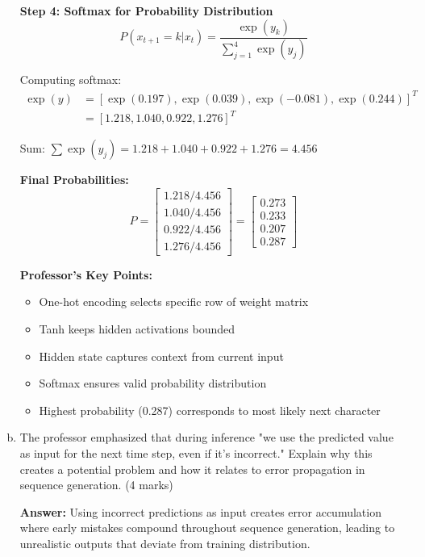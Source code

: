 \documentclass[12pt]{article}
\newcommand{\answer}[1]{{\color{answercolor}\textbf{Answer:} #1}}
\begin{document}
\begin{enumerate}[(a)]
{    \textbf{Step 4: Softmax for Probability Distribution}
    $$P(x_{t+1} = k | x_t) = \frac{\exp(y_k)}{\sum_{j=1}^4 \exp(y_j)}$$
    
    Computing softmax:
    \begin{align}
    \exp(y) &= [\exp(0.197), \exp(0.039), \exp(-0.081), \exp(0.244)]^T \\
    &= [1.218, 1.040, 0.922, 1.276]^T
    \end{align}
    
    Sum: $\sum \exp(y_j) = 1.218 + 1.040 + 0.922 + 1.276 = 4.456$
    
    \textbf{Final Probabilities:}
    $$P = \begin{bmatrix} 1.218/4.456 \\ 1.040/4.456 \\ 0.922/4.456 \\ 1.276/4.456 \end{bmatrix} = \begin{bmatrix} 0.273 \\ 0.233 \\ 0.207 \\ 0.287 \end{bmatrix}$$
    
    \textbf{Professor's Key Points:}
    \begin{itemize}
        \item One-hot encoding selects specific row of weight matrix
        \item Tanh keeps hidden activations bounded
        \item Hidden state captures context from current input
        \item Softmax ensures valid probability distribution
        \item Highest probability (0.287) corresponds to most likely next character
    \end{itemize}
    }
    
    \item The professor emphasized that during inference "we use the predicted value as input for the next time step, even if it's incorrect." Explain why this creates a potential problem and how it relates to error propagation in sequence generation. \hfill (4 marks)
    
    \answer{Using incorrect predictions as input creates error accumulation where early mistakes compound throughout sequence generation, leading to unrealistic outputs that deviate from training distribution.}
    

\end{enumerate}
\end{document}

